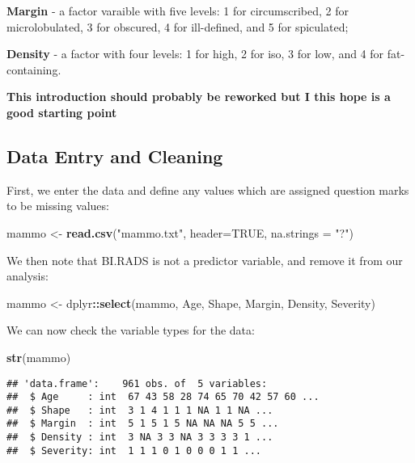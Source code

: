 \documentclass[]{article}
\newenvironment{Shaded}{\begin{snugshade}}{\end{snugshade}}
\newcommand{\KeywordTok}[1]{\textcolor[rgb]{0.13,0.29,0.53}{\textbf{#1}}}
\newcommand{\DataTypeTok}[1]{\textcolor[rgb]{0.13,0.29,0.53}{#1}}
\newcommand{\StringTok}[1]{\textcolor[rgb]{0.31,0.60,0.02}{#1}}
\newcommand{\OtherTok}[1]{\textcolor[rgb]{0.56,0.35,0.01}{#1}}
\newcommand{\OperatorTok}[1]{\textcolor[rgb]{0.81,0.36,0.00}{\textbf{#1}}}
\newcommand{\NormalTok}[1]{#1}
\begin{document}
\textbf{Margin} - a factor varaible with five levels: 1 for
circumscribed, 2 for microlobulated, 3 for obscured, 4 for ill-defined,
and 5 for spiculated;

\textbf{Density} - a factor with four levels: 1 for high, 2 for iso, 3
for low, and 4 for fat-containing.

\textbf{This introduction should probably be reworked but I this hope is
a good starting point}

\subsection{Data Entry and Cleaning}\label{data-entry-and-cleaning}

First, we enter the data and define any values which are assigned
question marks to be missing values:

\begin{Shaded}
\begin{Highlighting}[]
\NormalTok{mammo <-}\StringTok{ }\KeywordTok{read.csv}\NormalTok{(}\StringTok{"mammo.txt"}\NormalTok{, }\DataTypeTok{header=}\OtherTok{TRUE}\NormalTok{, }\DataTypeTok{na.strings =} \StringTok{"?"}\NormalTok{)}
\end{Highlighting}
\end{Shaded}

We then note that BI.RADS is not a predictor variable, and remove it
from our analysis:

\begin{Shaded}
\begin{Highlighting}[]
\NormalTok{mammo <-}\StringTok{ }\NormalTok{dplyr}\OperatorTok{::}\KeywordTok{select}\NormalTok{(mammo, Age, Shape, Margin, Density, Severity)}
\end{Highlighting}
\end{Shaded}

We can now check the variable types for the data:

\begin{Shaded}
\begin{Highlighting}[]
\KeywordTok{str}\NormalTok{(mammo)}
\end{Highlighting}
\end{Shaded}

\begin{verbatim}
## 'data.frame':    961 obs. of  5 variables:
##  $ Age     : int  67 43 58 28 74 65 70 42 57 60 ...
##  $ Shape   : int  3 1 4 1 1 1 NA 1 1 NA ...
##  $ Margin  : int  5 1 5 1 5 NA NA NA 5 5 ...
##  $ Density : int  3 NA 3 3 NA 3 3 3 3 1 ...
##  $ Severity: int  1 1 1 0 1 0 0 0 1 1 ...
\end{verbatim}
\end{document}
